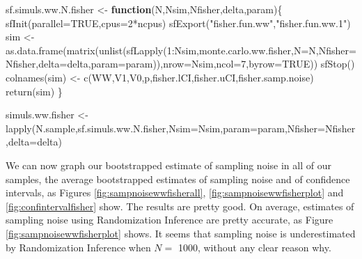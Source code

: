 \documentclass[
]{book}
\newenvironment{Shaded}{\begin{snugshade}}{\end{snugshade}}
\newcommand{\AttributeTok}[1]{\textcolor[rgb]{0.77,0.63,0.00}{#1}}
\newcommand{\ConstantTok}[1]{\textcolor[rgb]{0.00,0.00,0.00}{#1}}
\newcommand{\ControlFlowTok}[1]{\textcolor[rgb]{0.13,0.29,0.53}{\textbf{#1}}}
\newcommand{\DecValTok}[1]{\textcolor[rgb]{0.00,0.00,0.81}{#1}}
\newcommand{\FunctionTok}[1]{\textcolor[rgb]{0.00,0.00,0.00}{#1}}
\newcommand{\NormalTok}[1]{#1}
\newcommand{\OtherTok}[1]{\textcolor[rgb]{0.56,0.35,0.01}{#1}}
\newcommand{\SpecialCharTok}[1]{\textcolor[rgb]{0.00,0.00,0.00}{#1}}
\newcommand{\StringTok}[1]{\textcolor[rgb]{0.31,0.60,0.02}{#1}}
\theoremstyle{definition}
\theoremstyle{definition}
\theoremstyle{definition}
\theoremstyle{definition}
\theoremstyle{remark}
\begin{document}
\begin{Shaded}
\begin{Highlighting}[]
\NormalTok{sf.simuls.ww.N.fisher }\OtherTok{\textless{}{-}} \ControlFlowTok{function}\NormalTok{(N,Nsim,Nfisher,delta,param)\{}
  \FunctionTok{sfInit}\NormalTok{(}\AttributeTok{parallel=}\ConstantTok{TRUE}\NormalTok{,}\AttributeTok{cpus=}\DecValTok{2}\SpecialCharTok{*}\NormalTok{ncpus)}
  \FunctionTok{sfExport}\NormalTok{(}\StringTok{"fisher.fun.ww"}\NormalTok{,}\StringTok{"fisher.fun.ww.1"}\NormalTok{)}
\NormalTok{  sim }\OtherTok{\textless{}{-}} \FunctionTok{as.data.frame}\NormalTok{(}\FunctionTok{matrix}\NormalTok{(}\FunctionTok{unlist}\NormalTok{(}\FunctionTok{sfLapply}\NormalTok{(}\DecValTok{1}\SpecialCharTok{:}\NormalTok{Nsim,monte.carlo.ww.fisher,}\AttributeTok{N=}\NormalTok{N,}\AttributeTok{Nfisher=}\NormalTok{Nfisher,}\AttributeTok{delta=}\NormalTok{delta,}\AttributeTok{param=}\NormalTok{param)),}\AttributeTok{nrow=}\NormalTok{Nsim,}\AttributeTok{ncol=}\DecValTok{7}\NormalTok{,}\AttributeTok{byrow=}\ConstantTok{TRUE}\NormalTok{))}
  \FunctionTok{sfStop}\NormalTok{()}
  \FunctionTok{colnames}\NormalTok{(sim) }\OtherTok{\textless{}{-}} \FunctionTok{c}\NormalTok{(}\StringTok{\textquotesingle{}WW\textquotesingle{}}\NormalTok{,}\StringTok{\textquotesingle{}V1\textquotesingle{}}\NormalTok{,}\StringTok{\textquotesingle{}V0\textquotesingle{}}\NormalTok{,}\StringTok{\textquotesingle{}p\textquotesingle{}}\NormalTok{,}\StringTok{\textquotesingle{}fisher.lCI\textquotesingle{}}\NormalTok{,}\StringTok{\textquotesingle{}fisher.uCI\textquotesingle{}}\NormalTok{,}\StringTok{\textquotesingle{}fisher.samp.noise\textquotesingle{}}\NormalTok{)}
  \FunctionTok{return}\NormalTok{(sim)}
\NormalTok{\}}

\NormalTok{simuls.ww.fisher }\OtherTok{\textless{}{-}} \FunctionTok{lapply}\NormalTok{(N.sample,sf.simuls.ww.N.fisher,}\AttributeTok{Nsim=}\NormalTok{Nsim,}\AttributeTok{param=}\NormalTok{param,}\AttributeTok{Nfisher=}\NormalTok{Nfisher,}\AttributeTok{delta=}\NormalTok{delta)}
\end{Highlighting}
\end{Shaded}

We can now graph our bootstrapped estimate of sampling noise in all of our samples, the average bootstrapped estimates of sampling noise and of confidence intervals, as Figures \ref{fig:sampnoisewwfisherall}, \ref{fig:sampnoisewwfisherplot} and \ref{fig:confintervalfisher} show.
The results are pretty good.
On average, estimates of sampling noise using Randomization Inference are pretty accurate, as Figure \ref{fig:sampnoisewwfisherplot} shows.
It seems that sampling noise is underestimated by Randomization Inference when \(N=\) 1000, without any clear reason why.
\end{document}
